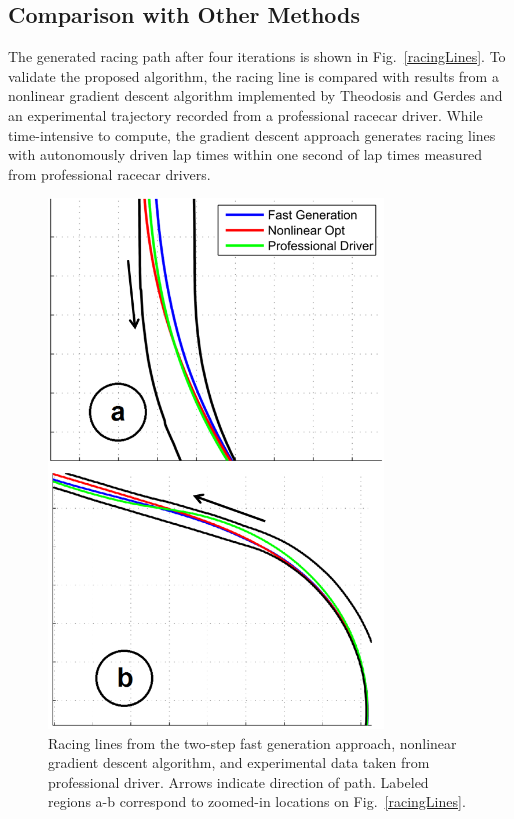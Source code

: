 \documentclass[twocolumn,10pt, final]{asme2e}
\begin{document}
\subsection*{Comparison with Other Methods}
The generated racing path after four iterations is shown in
Fig.~\ref{racingLines}. To validate the proposed algorithm, the racing line is compared with results from a nonlinear gradient descent algorithm implemented by 
Theodosis and Gerdes \cite{theodosis} and an experimental trajectory recorded from a professional racecar driver.
 While time-intensive to compute, the gradient descent approach generates racing lines with autonomously driven lap times within one second of
lap times measured from professional racecar drivers. 

\begin{figure}
\centering
\includegraphics[width=3.5in]{figures/composite1.png}
\caption{Racing lines from the two-step fast generation approach, nonlinear gradient descent algorithm, and experimental data taken
from professional driver. Arrows indicate direction of path. Labeled regions a-b correspond to zoomed-in locations on Fig.~\ref{racingLines}. }
\label{compositeFig1}
\end{figure}
\end{document}
